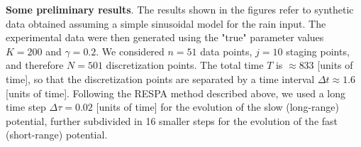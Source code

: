 \documentclass[11pt, a4paper]{article}
\newcommand{\bt}{\pmb\theta}
\begin{document}
%
%
%
%
\textbf{Some preliminary results}. The results shown in the figures refer to synthetic data obtained assuming a simple sinusoidal model for the rain input. The experimental data were then generated using the "true" parameter values $K=200$ and $\gamma = 0.2$. We considered $n=51$ data points, $j=10$ staging points, and therefore $N=501$ discretization points. The total time $T$ is $\approx 833$ [units of time], so that the discretization points are separated by a time interval $\Delta t \approx 1.6 $ [units of time]. Following the RESPA method described above, we used a long time step $\Delta \tau = 0.02$ [units of time] for the evolution of the slow (long-range) potential, further subdivided in 16 smaller steps for the evolution of the fast (short-range) potential.
\end{document}

